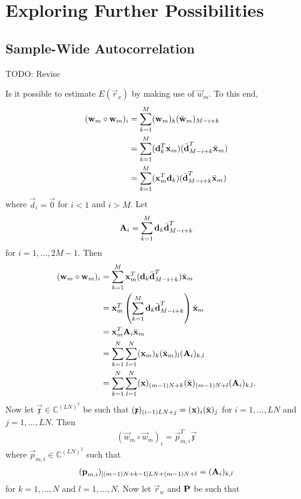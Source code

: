 \documentclass[a4paper, openany, oneside]{memoir}
\begin{document}
\section{Exploring Further Possibilities}
\subsection{Sample-Wide Autocorrelation}
TODO: Revise

Is it possible to estimate $E(\vec{r}_x)$ by making use of $\vec{w}_m$. To this end,
\begin{align*}
    (\boldsymbol{\mathbf{w}}_m \circ \boldsymbol{\mathbf{w}}_m)_i &= \sum_{k=1}^M (\boldsymbol{\mathbf{w}}_m)_k (\bar{\boldsymbol{\mathbf{w}}}_m)_{M-i+k} \\
    &= \sum_{k=1}^M (\boldsymbol{\mathbf{d}}_k^T \boldsymbol{\mathbf{x}}_m)(\bar{\boldsymbol{\mathbf{d}}}_{M-i+k}^T \bar{\boldsymbol{\mathbf{x}}}_m) \\
    &= \sum_{k=1}^M (\boldsymbol{\mathbf{x}}_m^T \boldsymbol{\mathbf{d}}_k)(\bar{\boldsymbol{\mathbf{d}}}_{M-i+k}^T \bar{\boldsymbol{\mathbf{x}}}_m)
\end{align*}
where $\vec{d}_i = \vec{0}$ for $i < 1$ and $i > M$. Let
\begin{align*}
     \boldsymbol{\mathbf{A}}_i = \sum_{k=1}^M  \boldsymbol{\mathbf{d}}_k \bar{\boldsymbol{\mathbf{d}}}_{M-i+k}^T
\end{align*}
for $i = 1,\ldots,2M-1$. Then
\begin{align*}
    (\boldsymbol{\mathbf{w}}_m \circ \boldsymbol{\mathbf{w}}_m)_i &= \sum_{k=1}^M \boldsymbol{\mathbf{x}}_m^T (\boldsymbol{\mathbf{d}}_k \bar{\boldsymbol{\mathbf{d}}}_{M-i+k}^T) \bar{\boldsymbol{\mathbf{x}}}_m \\
    &= \boldsymbol{\mathbf{x}}_m^T\left(\sum_{k=1}^M  \boldsymbol{\mathbf{d}}_k \bar{\boldsymbol{\mathbf{d}}}_{M-i+k}^T\right) \bar{\boldsymbol{\mathbf{x}}}_m \\
    &= \boldsymbol{\mathbf{x}}_m^T \boldsymbol{\mathbf{A}}_i \bar{\boldsymbol{\mathbf{x}}}_m \\
    &= \sum_{k = 1}^N \sum_{l=1}^N (\boldsymbol{\mathbf{x}}_m)_k (\bar{\boldsymbol{\mathbf{x}}}_m)_l (\boldsymbol{\mathbf{A}}_i)_{k,l} \\
    &= \sum_{k = 1}^N \sum_{l=1}^N (\boldsymbol{\mathbf{x}})_{(m-1)N+k} (\bar{\boldsymbol{\mathbf{x}}})_{(m-1)N+l} (\boldsymbol{\mathbf{A}}_i)_{k,l}.
\end{align*}
Now let $\vec{\mathfrak{x}} \in \mathbb{C}^{(LN)^2}$ be such that $(\boldsymbol{\mathbf{\mathfrak{x}}})_{(i-1)LN+j} = (\boldsymbol{\mathbf{x}})_i (\bar{\boldsymbol{\mathbf{x}}})_j$ for $i = 1,\ldots,LN$ and $j = 1,\ldots,LN$. Then
\begin{align*}
    (\vec{w}_m \circ \vec{w}_m)_i = \vec{p}_{m,i}^T \vec{\mathfrak{x}}
\end{align*}
where $\vec{p}_{m,i} \in \mathbb{C}^{(LN)^2}$ such that
\begin{align*}
    (\boldsymbol{\mathbf{p}}_{m,i})_{[(m-1)N+k-1]LN+(m-1)N+l} = (\boldsymbol{\mathbf{A}}_i)_{k,l}
\end{align*}
for $k = 1,\ldots,N$ and $l = 1,\ldots,N$. Now let $\vec{r}_w$ and $\boldsymbol{\mathbf{P}}$ be such that
\end{document}
